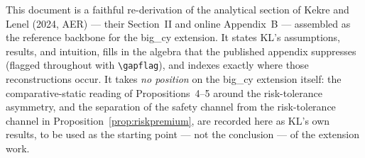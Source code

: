 This document is a faithful re-derivation of the analytical section of Kekre and
Lenel (2024, AER) --- their Section~II and online Appendix~B --- assembled as the
reference backbone for the big\_cy extension. It states KL's assumptions, results,
and intuition, fills in the algebra that the published appendix suppresses (flagged
throughout with \texttt{\textbackslash gapflag}), and indexes exactly where those
reconstructions occur. It takes \emph{no position} on the big\_cy extension itself:
the comparative-static reading of Propositions~4--5 around the risk-tolerance
asymmetry, and the separation of the safety channel from the risk-tolerance channel
in Proposition~\ref{prop:riskpremium}, are recorded here as KL's own results, to be
used as the starting point --- not the conclusion --- of the extension work.
